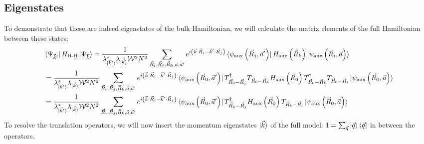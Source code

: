 \documentclass[prb]{revtex4-2}
\begin{document}
\subsection{Eigenstates}
To demonstrate that these are indeed eigenstates of the bulk Hamiltonian, we will calculate the matrix elements of the full Hamiltonian between these states:
\begin{equation}\begin{aligned}
	&\bra{\Psi_{\vec k^\prime}}H_\text{H-H} \ket{\Psi_{\vec k}} = \frac{1}{\lambda^*_{\ket{\vec k^\prime}} \lambda_{\ket{\vec k}} \mathcal{W}^2 N^2}\sum_{\vec R_i, \vec R_j, \vec R_k, \vec a, \vec a^\prime}e^{i\left(\vec{k}\cdot\vec{R}_i - \vec{k}^\prime\cdot\vec{R}_j\right)} \bra{\psi_\text{aux}\left(\vec R_j, \vec a^\prime\right)} H_\text{aux}\left(\vec R_k\right) \ket{\psi_\text{aux}\left(\vec R_i, \vec a\right)}\\
	&= \frac{1}{\lambda^*_{\ket{\vec k^\prime}} \lambda_{\ket{\vec k}} \mathcal{W}^2 N^2}\sum_{\vec R_i, \vec R_j, \vec R_k, \vec a, \vec a^\prime}e^{i\left(\vec{k}\cdot\vec{R}_i - \vec{k}^\prime\cdot\vec{R}_j\right)} \bra{\psi_\text{aux}\left(\vec R_0, \vec a^\prime\right)} T^\dagger_{\vec R_0 - \vec R_j} T_{\vec R_0 - \vec R_k} H_\text{aux}\left(\vec R_0\right) T^\dagger_{\vec R_0 - \vec R_k} T_{\vec R_0 - \vec R_i} \ket{\psi_\text{aux}\left(\vec R_0, \vec a\right)}\\
	&= \frac{1}{\lambda^*_{\ket{\vec k^\prime}} \lambda_{\ket{\vec k}} \mathcal{W}^2 N^2}\sum_{\vec R_i, \vec R_j, \vec R_k, \vec a, \vec a^\prime}e^{i\left(\vec{k}\cdot\vec{R}_i - \vec{k}^\prime\cdot\vec{R}_j\right)} \bra{\psi_\text{aux}\left(\vec R_0, \vec a^\prime\right)} T^\dagger_{\vec R_k - \vec R_j} H_\text{aux}\left(\vec R_0\right) T_{\vec R_k - \vec R_i} \ket{\psi_\text{aux}\left(\vec R_0, \vec a\right)}
\end{aligned}\end{equation}
To resolve the translation operators, we will now insert the momentum eigenstates \(\ket{\vec k}\) of the full model: \(1 = \sum_{\vec q}\ket{\vec q}\bra{\vec q}\) in between the operators.
\end{document}

